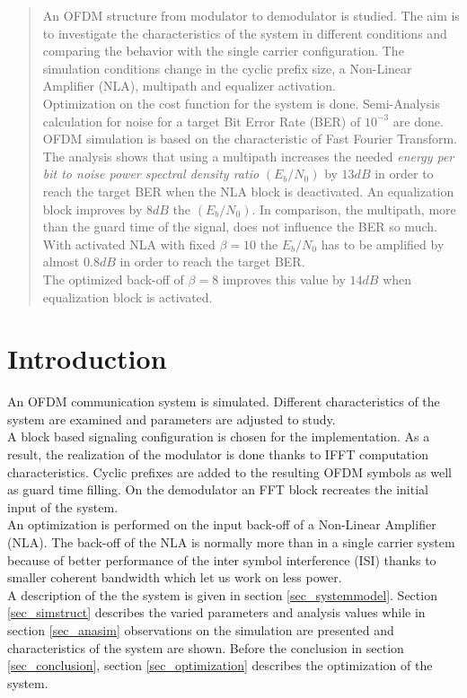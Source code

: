 \begin{abstract}
An OFDM structure from modulator to demodulator is studied. The aim is to investigate the characteristics of the system in different conditions and comparing the behavior with the single carrier configuration. The simulation conditions change in the cyclic prefix size, a Non-Linear Amplifier (NLA), multipath and equalizer activation. \\ Optimization on the cost function for the system is done. Semi-Analysis calculation for noise for a target Bit Error Rate (BER) of $10^{-3}$ are done. OFDM simulation is based on the characteristic of Fast Fourier Transform.\\
The analysis shows that using a multipath increases the needed \textit{energy per bit to noise power spectral density ratio} $(E_{b}/N_{0})$ by $13dB$ in order to reach the target BER when the NLA block is deactivated. An equalization block improves by $8dB$ the $(E_{b}/N_{0})$. In comparison, the multipath, more than the guard time of the signal, does not influence the BER so much.\\ With activated NLA with fixed $\beta=10$ the $E_{b}/N_{0}$ has to be amplified by almost $0.8dB$ in order to reach the target BER. \\ The optimized back-off of $\beta=8$ improves this value by $14dB$ when equalization block is activated.
 
\end{abstract}

\section{Introduction}
An OFDM communication system is simulated. Different characteristics of the system are examined and parameters are adjusted to study.\\ A block based signaling configuration is chosen for the implementation. As a result, the realization of the modulator is done thanks to IFFT computation characteristics. Cyclic prefixes are added to the resulting OFDM symbols as well as guard time filling. On the demodulator an FFT block recreates the initial input of the system. \\
An optimization is performed on the input back-off of a Non-Linear Amplifier (NLA). The back-off of the NLA is normally more than in a single carrier system because of better performance of the inter symbol interference (ISI) thanks to smaller coherent bandwidth which let us work on less power. \\
A description of the the system is given in section \ref{sec_systemmodel}. Section \ref{sec_simstruct} describes the varied parameters and analysis values while in section \ref{sec_anasim} observations on the simulation are presented and characteristics of the system are shown. Before the conclusion in section \ref{sec_conclusion}, section \ref{sec_optimization} describes the optimization of the system.

